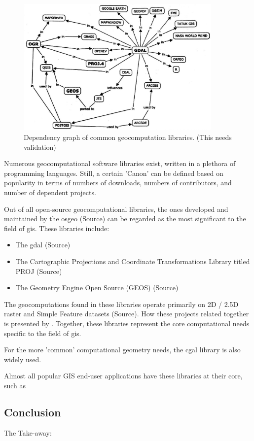 \begin{figure}
  \centering
  \graphicspath{ {../../assets/images/background} }
  \includegraphics[width=380px]{all-geo-libraries-explained.jpg}
  \caption{Dependency graph of common geocomputation libraries. (This needs validation) }
  \label{fig:geolib-dependencies}
\end{figure}

Numerous geocomputational software libraries exist, written in a plethora of programming languages. 
Still, a certain 'Canon' can be defined based on popularity in terms of numbers of downloads, numbers of contributors, and number of dependent projects.  

Out of all open-source geocomputational libraries, the ones developed and maintained by the \ac{osgeo} (Source) can be regarded as the most significant to the field of \ac{gis}. 
These libraries include:
\begin{itemize}[]
  \item The \ac{gdal} (Source) 
  \item The Cartographic Projections and Coordinate Transformations Library titled PROJ (Source)
  \item The Geometry Engine Open Source (GEOS) (Source)
\end{itemize}
The geocomputations found in these libraries operate primarily on 2D / 2.5D raster and Simple Feature datasets (Source).
How these projects related together is presented by .
Together, these libraries represent the core computational needs specific to the field of \ac{gis}. 

For the more 'common' computational geometry needs, the \ac{cgal} library is also widely used.

Almost all popular GIS end-user applications have these libraries at their core, such as 

\subsection{Conclusion}
The Take-away: 

